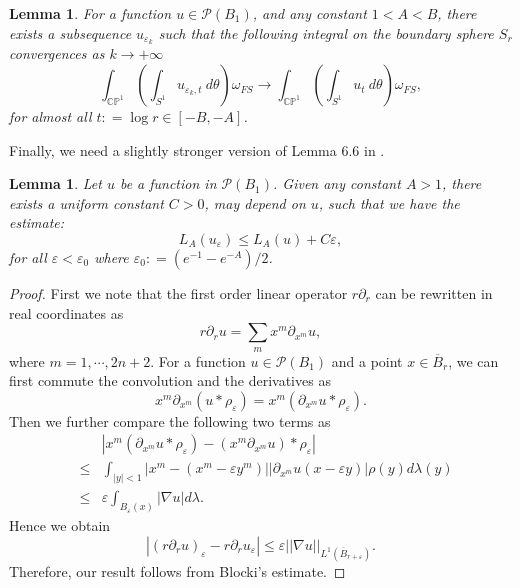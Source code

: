 \documentclass[a4paper,11pt]{amsart}
\numberwithin{equation}{section}
\newtheorem{lemma}[theorem]{Lemma}
\def\d{\partial}
\def\cP{{\mathcal P}}
\def\cP{{\mathcal P}}
\let\ep=\varepsilon
\def\bC{{\mathbb C}}
\def\bP{{\mathbb P}}
\begin{document}
\begin{lemma}
\label{lem-mt-004}
For a function $u\in \cP(B_1)$, and any constant $1< A < B$, 
there exists a subsequence $u_{\ep_k}$ such that 
the following integral on the boundary sphere $S_r$ convergences  as $k\rightarrow +\infty$
$$ \int_{\bC\bP^1}\left( \int_{S^1} u_{\ep_k, t} \ d\theta \right) \omega_{FS} 
\rightarrow \int_{\bC\bP^1}\left( \int_{S^1} u_t  \ d\theta \right) \omega_{FS}, $$
for almost all $t: =\log r \in [-B, {-A}]$. 
\end{lemma}


Finally, we need a slightly stronger version of Lemma 6.6 in \cite{Li23}.

\begin{lemma}
\label{lem-mt-005}
Let $u$ be a function in $\cP(B_1)$. 
Given any constant $A>1$, 
there exists a uniform constant $C>0$, may depend on $u$, such that we have the estimate: 
$$ L_A (u_{\ep}) \leq  L_A(u) + C\ep, $$
for all $\ep < \ep_0$ where $\ep_0: = (e^{-1} - e^{-A})/2$.
\end{lemma}
\begin{proof}
First we note that the first order linear operator $r\d_r$ can be rewritten in real coordinates as 
$$ r\d_r u  = \sum_{m} x^{m} \d_{x^m} u,  $$
where $m=1,\cdots, 2n+2$.
For a function $u\in\cP(B_1)$ and a point $x\in \overline{B}_r$, we can first commute the convolution and the 
derivatives as  
\begin{equation}
x^m \d_{x^m} (u * \rho_{\ep}) =  x^m (\d_{x^m} u * \rho_{\ep}).  
\end{equation}
Then we further compare the following two terms as 
\begin{eqnarray}
\label{mt-003}
&&\left|   x^m ( \d_{x^m} u * \rho_{\ep}) -  (x^m \d_{x^m} u) * \rho_{\ep} \right|
\nonumber\\
&\leq& \int_{|y|<1} \left| x^m - (x^m - \ep y^m)  \right|  |\d_{x^m}u (x-\ep y)| \rho(y) d\lambda(y)
\nonumber\\
&\leq& \ep \int_{B_{\ep}(x)} |\nabla u | d\lambda.
\end{eqnarray}
Hence we obtain 
\begin{equation}
\left|  (r\d_r u)_{\ep} - r\d_r u_{\ep} \right| \leq \ep || \nabla u ||_{L^1(\overline{B}_{r+\ep})}.
\end{equation}
Therefore, our result follows from Blocki's estimate. 





\end{proof}
\end{document}
